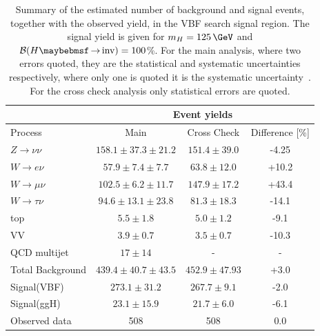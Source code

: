\begin{table}[!htb]
\centering
\begin{tabular}{|l|c|c|c|}
\hline 
        & \multicolumn{3}{c|}{Event yields} \\
\hline
Process               & Main                      & Cross Check       & Difference [\%] \\
\hline\hline
$Z\rightarrow\nu\nu$  & $158.1 \pm 37.3 \pm 21.2$ & $151.4 \pm 39.0$  &           -4.25 \\
$W\rightarrow e\nu$   & $ 57.9 \pm 7.4  \pm  7.7$ &  $63.8 \pm 12.0$  &           +10.2 \\
$W\rightarrow\mu\nu$  & $102.5 \pm 6.2  \pm 11.7$ & $147.9 \pm 17.2$  &           +43.4 \\
$W\rightarrow\tau\nu$ & $ 94.6 \pm 13.1 \pm 23.8$ &  $81.3 \pm 18.3$  &           -14.1 \\
top                   & $  5.5 \pm 1.8$           &   $5.0 \pm 1.2$   &            -9.1 \\ 
VV                    & $  3.9 \pm 0.7$           &   $3.5 \pm 0.7$   &           -10.3 \\  
QCD multijet          & $   17 \pm 14$            &                -  &               - \\
\hline\hline                                                     
Total Background      & $439.4 \pm 40.7 \pm 43.5$ &   $452.9\pm47.93$ &            +3.0 \\
\hline\hline                                                     
Signal(VBF)           & $273.1 \pm 31.2 $         &   $267.7 \pm 9.1$ &            -2.0 \\
Signal(ggH)           & $ 23.1 \pm 15.9 $         &   $ 21.7 \pm 6.0$ &            -6.1 \\
\hline\hline                                                     
Observed data         & 508                       &               508 &             0.0 \\
\hline
\end{tabular}
\caption[Summary of the estimated number of background and signal events, together with the observed yield, in the VBF search signal region.]
{Summary of the estimated number of background and signal events, together with the observed yield, in the \gls{VBF} search signal region. The signal yield is given for $m_H=125\,\GeV$ and $\BRinv=100$\%. For the main analysis, where two errors quoted, they are the statistical and systematic uncertainties respectively, where only one is quoted it is the systematic uncertainty~\cite{ARTICLE:CMSVBFHiggsInvisibleParkedAnalysisPAS}. For the cross check analysis only statistical errors are quoted.}
\label{TABLE:ParkedDataAnalysis_Results_Summary}
\end{table}

